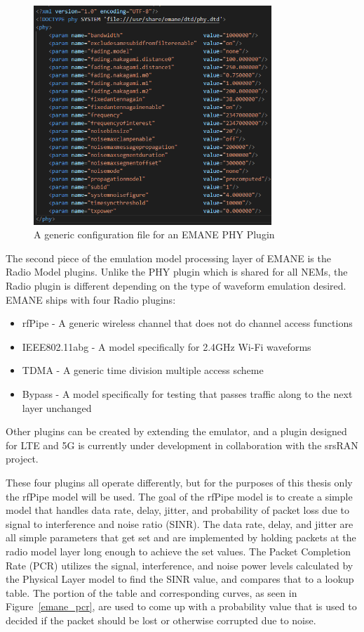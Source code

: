 \begin{figure}[!ht]
    \centering
    \includegraphics[width=0.8\textwidth,keepaspectratio]{Images/Chpt2/emane_phy.png}
    \caption{A generic configuration file for an EMANE PHY Plugin}
    \label{emane_phy}
\end{figure}

The second piece of the emulation model processing layer of EMANE is the Radio Model plugins.
Unlike the PHY plugin which is shared for all NEMs, the Radio plugin is different depending on the type of waveform emulation desired.
EMANE ships with four Radio plugins:
\begin{itemize}
    \item rfPipe - A generic wireless channel that does not do channel access functions
    \item IEEE802.11abg - A model specifically for 2.4GHz Wi-Fi waveforms
    \item TDMA - A generic time division multiple access scheme
    \item Bypass - A model specifically for testing that passes traffic along to the next layer unchanged
\end{itemize}
Other plugins can be created by extending the emulator, and a plugin designed for LTE and 5G is currently under development in collaboration with the srsRAN project.\par
These four plugins all operate differently, but for the purposes of this thesis only the rfPipe model will be used.
The goal of the rfPipe model is to create a simple model that handles data rate, delay, jitter, and probability of packet loss due to signal to interference and noise ratio (SINR).
The data rate, delay, and jitter are all simple parameters that get set and are implemented by holding packets at the radio model layer long enough to achieve the set values.
The Packet Completion Rate (PCR) utilizes the signal, interference, and noise power levels calculated by the Physical Layer model to find the SINR value, and compares that to a lookup table.
The portion of the table and corresponding curves, as seen in Figure~\ref{emane_pcr}, are used to come up with a probability value that is used to decided if the packet should be lost or otherwise corrupted due to noise.

